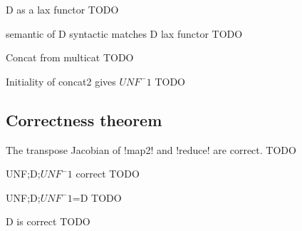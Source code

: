 \begin{example}{D as a lax functor}
    TODO
\end{example}

\begin{proposition}{semantic of D syntactic matches D lax functor}
    TODO
\end{proposition}

\begin{definition}{Concat from multicat}
    TODO
\end{definition}

\begin{proposition}{Initiality of concat2 gives $UNF^-1$}
    TODO
\end{proposition}

\subsection{Correctness theorem} %
\label{sub:Correctness theorem}

\begin{proposition}{The transpose Jacobian of !map2! and !reduce! are correct.}
    TODO
\end{proposition}

\begin{theorem}{UNF;D;$UNF^-1$ correct}
    TODO
\end{theorem}

\begin{proposition}{UNF;D;$UNF^-1$=D}
    TODO
\end{proposition}

\begin{theorem}{D is correct}
    TODO
\end{theorem}
